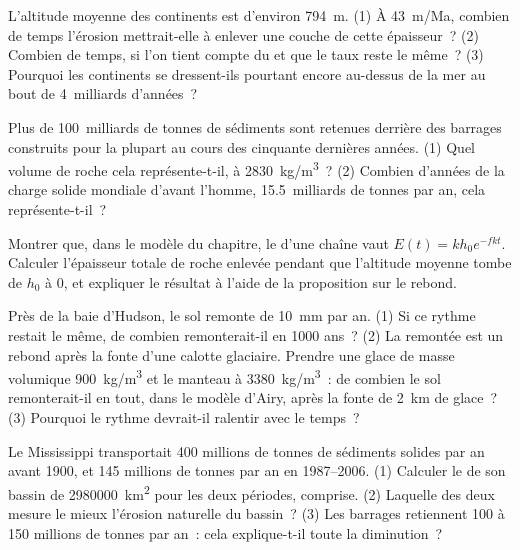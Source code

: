 \begin{exercise}[$\star\star$]\label{exo:g12:destruction-of-mountains:10}
L'altitude moyenne des continents est d'environ \qty{794}{m}. (1) À
\qty{43}{m/Ma}, combien de temps l'érosion mettrait-elle à enlever une
couche de cette épaisseur~? (2) Combien de temps, si l'on tient compte du
 et que le taux reste le même~? (3) Pourquoi les
continents se dressent-ils pourtant encore au-dessus de la mer au bout de
4~milliards d'années~?
\end{exercise}

\begin{exercise}[$\star\star$]\label{exo:g12:destruction-of-mountains:11}
Plus de 100~milliards de tonnes de sédiments sont retenues derrière des
barrages construits pour la plupart au cours des cinquante dernières
années. (1) Quel volume de roche cela représente-t-il, à
\qty{2830}{kg/m^3}~? (2) Combien d'années de la charge solide mondiale
d'avant l'homme, 15.5~milliards de tonnes par an, cela représente-t-il~?
\end{exercise}

\begin{exercise}[$\star\star\star$]\label{exo:g12:destruction-of-mountains:12}
Montrer que, dans le modèle du chapitre, le  d'une chaîne
vaut $E(t) = k h_0 e^{-fkt}$. Calculer l'épaisseur totale de roche enlevée
pendant que l'altitude moyenne tombe de $h_0$ à 0, et expliquer le résultat
à l'aide de la proposition sur le rebond.
\end{exercise}

\begin{exercise}[$\star\star\star$]\label{exo:g12:destruction-of-mountains:13}
Près de la baie d'Hudson, le sol remonte de \qty{10}{mm} par an. (1) Si ce
rythme restait le même, de combien remonterait-il en 1000 ans~? (2) La
remontée est un rebond après la fonte d'une calotte glaciaire. Prendre une
glace de masse volumique \qty{900}{kg/m^3} et le manteau à
\qty{3380}{kg/m^3}~: de combien le sol remonterait-il en tout, dans le
modèle d'Airy, après la fonte de \qty{2}{km} de glace~? (3) Pourquoi le
rythme devrait-il ralentir avec le temps~?
\end{exercise}

\begin{exercise}[$\star\star\star$]\label{exo:g12:destruction-of-mountains:14}
Le Mississippi transportait 400 millions de tonnes de sédiments solides par
an avant 1900, et 145 millions de tonnes par an en 1987--2006. (1) Calculer
le  de son bassin de \qty{2980000}{km^2} pour les deux
périodes,  comprise. (2) Laquelle des deux mesure le mieux
l'érosion naturelle du bassin~? (3) Les barrages retiennent 100 à 150
millions de tonnes par an~: cela explique-t-il toute la diminution~?
\end{exercise}


